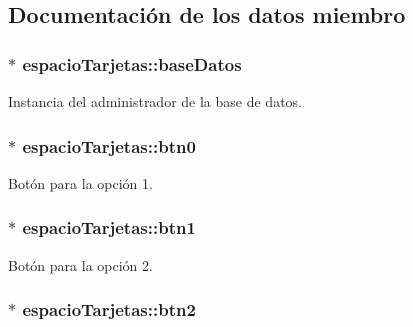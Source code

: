 \subsection{Documentación de los datos miembro}
\hypertarget{classespacio_tarjetas_ae26629329afda23bc6252054dcad92d3}{}
\subsubsection[{base\+Datos}]{$\ast$ espacio\+Tarjetas\+::base\+Datos\hspace{0.3cm}{\ttfamily [private]}}\label{classespacio_tarjetas_ae26629329afda23bc6252054dcad92d3}


Instancia del administrador de la base de datos. 

\hypertarget{classespacio_tarjetas_a1b66f906dbd856b501412a42c50da0af}{}
\subsubsection[{btn0}]{$\ast$ espacio\+Tarjetas\+::btn0\hspace{0.3cm}{\ttfamily [private]}}\label{classespacio_tarjetas_a1b66f906dbd856b501412a42c50da0af}


Botón para la opción 1. 

\hypertarget{classespacio_tarjetas_a6f9729b868bcfef80cd3c71e22950425}{}
\subsubsection[{btn1}]{$\ast$ espacio\+Tarjetas\+::btn1\hspace{0.3cm}{\ttfamily [private]}}\label{classespacio_tarjetas_a6f9729b868bcfef80cd3c71e22950425}


Botón para la opción 2. 

\hypertarget{classespacio_tarjetas_ab0d28914026c02d7bd073d79e9c2f84e}{}
\subsubsection[{btn2}]{$\ast$ espacio\+Tarjetas\+::btn2\hspace{0.3cm}{\ttfamily [private]}}\label{classespacio_tarjetas_ab0d28914026c02d7bd073d79e9c2f84e}


